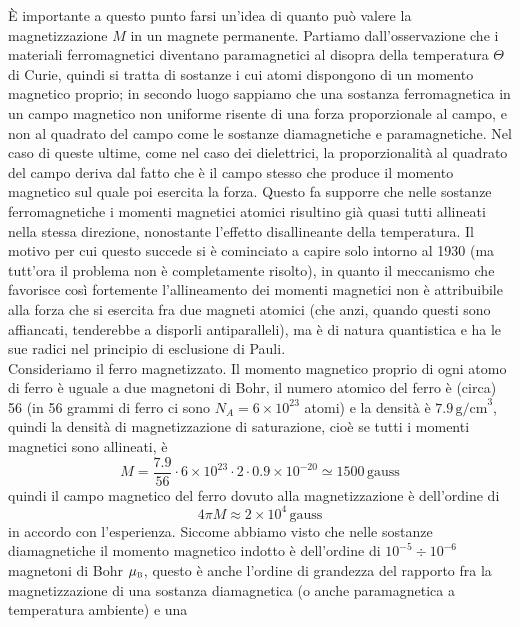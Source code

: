 \`E importante a questo punto farsi un'idea di quanto pu\`o valere la
magnetizzazione $M$ in un magnete permanente. Partiamo dall'osservazione che i
materiali ferromagnetici diventano paramagnetici al disopra della temperatura
$\Theta$ di Curie, quindi si tratta di sostanze i cui atomi dispongono di un
momento magnetico proprio; in secondo luogo sappiamo che una sostanza
ferromagnetica in un campo magnetico non uniforme risente di una forza
proporzionale al campo, e non al quadrato del campo come le sostanze
diamagnetiche e paramagnetiche. Nel caso di queste ultime, come nel caso dei
dielettrici, la proporzionalit\`a al quadrato del campo deriva dal fatto che \`e
il campo stesso che produce il momento magnetico sul quale poi esercita la
forza. Questo fa supporre che nelle sostanze ferromagnetiche i momenti magnetici
atomici risultino gi\`a quasi tutti allineati nella stessa direzione, nonostante
l'effetto disallineante della temperatura. Il motivo per cui questo succede si
\`e cominciato a capire solo intorno al 1930 (ma tutt'ora
il problema non \`e completamente risolto), in quanto il meccanismo che
favorisce cos\`i fortemente l'allineamento dei momenti magnetici non \`e
attribuibile alla forza che si esercita fra due magneti atomici (che anzi,
quando questi sono affiancati, tenderebbe a disporli antiparalleli), ma \`e di
natura quantistica e ha le sue radici nel principio di esclusione di Pauli.\\
Consideriamo il ferro magnetizzato. Il momento magnetico proprio di ogni atomo
di ferro \`e uguale a due magnetoni di Bohr, il numero atomico del ferro \`e
(circa) 56 (in 56 grammi di ferro ci sono $N_A=6\times10^{23}$ atomi) e la
densit\`a \`e $7.9\,\mathrm{g/cm}^3$, quindi la densit\`a di magnetizzazione di
saturazione, cio\`e se tutti i momenti magnetici sono allineati, \`e
\begin{equation}
  M=\frac{7.9}{56}\cdot6\times10^{23}\cdot2\cdot0.9\times10^{-20}
  \simeq1500\,\mathrm{gauss}
  \tag{15.46}
\end{equation}
quindi il campo magnetico del ferro dovuto alla magnetizzazione \`e dell'ordine
di
\begin{equation}
  4\pi M\approx2\times10^4\,\mathrm{gauss}
  \tag{15.47}
\end{equation}
in accordo con l'esperienza. Siccome abbiamo visto che nelle sostanze
diamagnetiche il momento magnetico indotto \`e dell'ordine di
$10^{-5}\div10^{-6}$ magnetoni di Bohr $\mu_{\textsc b}$, questo \`e anche
l'ordine di grandezza del rapporto fra la magnetizzazione di una sostanza
diamagnetica (o anche paramagnetica a temperatura ambiente) e una
